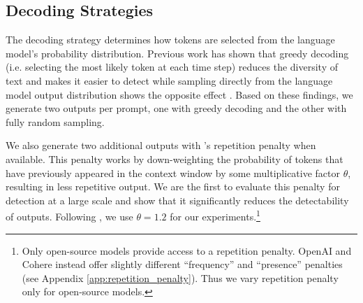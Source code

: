 \documentclass[11pt]{article}
\begin{document}
\subsection{Decoding Strategies}
\label{sec:decoding-strategies}
The decoding strategy determines how tokens are selected from the language model's probability distribution. Previous work has shown that greedy decoding (i.e. selecting the most likely token at each time step) reduces the diversity of text and makes it easier to detect while sampling directly from the language model output distribution shows the opposite effect \citep{ippolito-etal-2020-automatic}. Based on these findings, we generate two outputs per prompt, one with greedy decoding and the other with fully random sampling.

We also generate two additional outputs with \citet{keskar2019ctrl}'s repetition penalty when available. This penalty works by down-weighting the probability of tokens that have previously appeared in the context window by some multiplicative factor $\theta$, resulting in less repetitive output. We are the first to evaluate this penalty for detection at a large scale and show that it significantly reduces the detectability of outputs. Following \citet{keskar2019ctrl}, we use $\theta=1.2$ for our experiments.\footnote{Only open-source models provide access to a repetition penalty. OpenAI and Cohere instead offer slightly different ``frequency'' and ``presence'' penalties (see Appendix \ref{app:repetition_penalty}). Thus we vary repetition penalty only for open-source models.}
\end{document}
